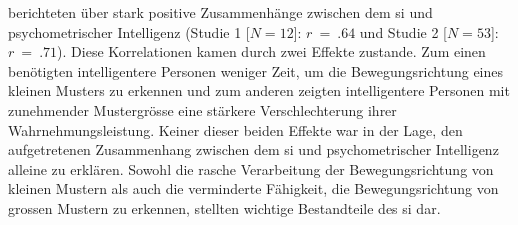 \documentclass[11pt, twoside, a4paper]{book}		%
\begin{document}
\citeauthor{Melnick2013} berichteten über stark positive Zusammenhänge zwischen dem \gls{si} und psychometrischer Intelligenz (Studie 1 [$N=12$]: $r~=~.64$ und Studie 2 [$N=53$]: $r~=~.71$). Diese Korrelationen kamen durch zwei Effekte zustande. Zum einen benötigten intelligentere Personen weniger Zeit, um die Bewegungsrichtung eines kleinen Musters zu erkennen und zum anderen zeigten intelligentere Personen mit zunehmender Mustergrösse eine stärkere Verschlechterung ihrer Wahrnehmungsleistung. Keiner dieser beiden Effekte war in der Lage, den aufgetretenen Zusammenhang zwischen dem \gls{si} und psychometrischer Intelligenz alleine zu erklären. Sowohl die rasche Verarbeitung der Bewegungsrichtung von kleinen Mustern als auch die verminderte Fähigkeit, die Bewegungsrichtung von grossen Mustern zu erkennen, stellten wichtige Bestandteile des \gls{si} dar. 
\end{document}
